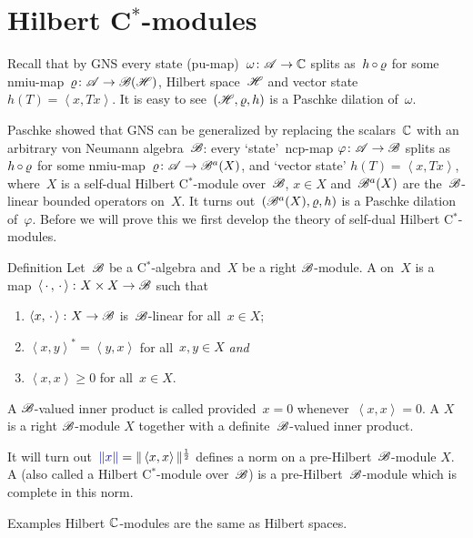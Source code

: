 \documentclass[b]{subfiles}
\begin{document}
\section{Hilbert C$^*$-modules}
\begin{parsec}%
\begin{point}%
Recall that by GNS
    every state (pu-map)~$\omega\colon \mathscr{A} \to \mathbb{C}$
    splits as~$h \mathop{\circ} \varrho$
    for some nmiu-map~$\varrho\colon \mathscr{A} \to \mathscr{B}(\mathscr{H})$,
        Hilbert space~$\mathscr{H}$
        and vector state~$h (T) =  \left<x, T x\right>$.
It is easy to see~$(\mathscr{H}, \varrho, h)$ is a Paschke dilation of~$\omega$.


Paschke showed that GNS can be generalized by replacing the scalars~$\mathbb{C}$
    with an arbitrary von Neumann algebra~$\mathscr{B}$:
    every `state'~ncp-map $\varphi\colon \mathscr{A} \to \mathscr{B}$
    splits as~$h \mathop{\circ} \varrho$
    for some nmiu-map~$\varrho\colon \mathscr{A} \to \mathscr{B}^a (X)$,
    and `vector state' $h(T) = \left<x, Tx\right>$,
    where~$X$ is a self-dual Hilbert C$^*$-module over~$\mathscr{B}$, $x \in X$
     and~$\mathscr{B}^a(X)$ are the~$\mathscr{B}$-linear bounded operators on~$X$.
It turns out~$(\mathscr{B}^a(X), \varrho, h)$
    is a Paschke dilation of~$\varphi$.
Before we will prove this
    we first develop the theory of self-dual Hilbert C$^*$-modules.
\end{point}
\begin{point}{Definition}%
    Let~$\mathscr{B}$ be a C$^*$-algebra and~$X$
        be a right $\mathscr{B}$-module.
        A  on~$X$
        is a map~$\left<\,\cdot\,,\,\cdot\,\right>\colon X \times X \to \mathscr{B}$
        such that
        \begin{enumerate}
            \item $\left<x, \,\cdot\,\right> \colon X \to  \mathscr{B}$
                    is~$\mathscr{B}$-linear for all~$x \in X$;
            \item $\left<x,y\right>^* = \left<y,x\right>$
                for all~$x,y\in X$ \emph{and}
            \item $\left<x,x\right> \geq 0$ for all~$x \in X$.
        \end{enumerate}
    A $\mathscr{B}$-valued inner product is called 
        provided~$x = 0$ whenever~$\left<x,x\right>=0$.
    A  $X$
        is a right $\mathscr{B}$-module $X$
        together with a definite~$\mathscr{B}$-valued inner product.

It will turn out~$\Define{\| x \|} = \| \left<x,x\right> \|^{\frac{1}{2}}$
        defines a norm on a pre-Hilbert~$\mathscr{B}$-module $X$.
A 
    (also called a Hilbert C$^*$-module over~$\mathscr{B}$)
    is a pre-Hilbert~$\mathscr{B}$-module
    which is complete in this norm.
\end{point}
\begin{point}{Examples}%
Hilbert $\mathbb{C}$-modules are the same as Hilbert spaces.


\end{point}
\end{parsec}
\end{document}
